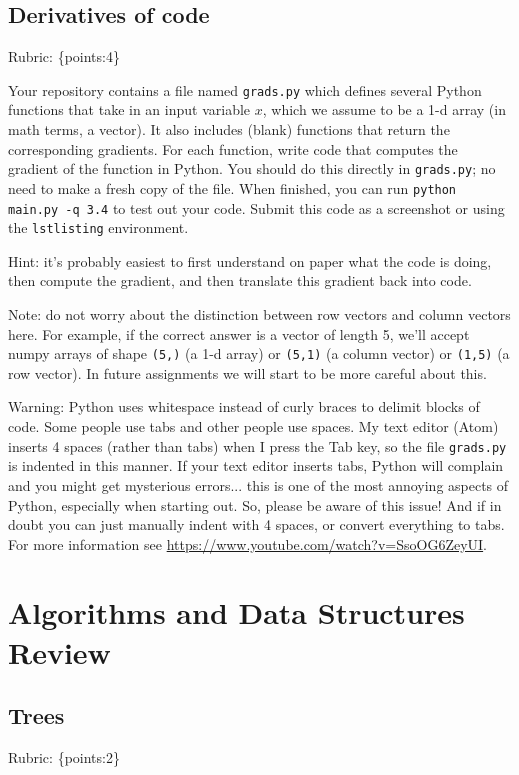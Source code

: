 \documentclass{article}
\def\rubric#1{\gre{Rubric: \{#1\}}}{}
\def\blu#1{{\color{blu}#1}}
\def\gre#1{{\color{gre}#1}}
\begin{document}
	\subsection{Derivatives of code}
	
	\rubric{points:4}
	
	Your repository contains a file named \texttt{grads.py} which defines several Python functions that take in an input variable $x$, which we assume to be a 1-d array (in math terms, a vector).
	It also includes (blank) functions that return the corresponding gradients.
	For each function, \blu{write code that computes the gradient of the function} in Python.
	You should do this directly in \texttt{grads.py}; no need to make a fresh copy of the file. When finished, you can run \texttt{python main.py -q 3.4} to test out your code. \blu{Submit this code as a screenshot or using the \texttt{lstlisting} environment.}
	
	Hint: it's probably easiest to first understand on paper what the code is doing, then compute
	the gradient, and then translate this gradient back into code.
	
	Note: do not worry about the distinction between row vectors and column vectors here.
	For example, if the correct answer is a vector of length 5, we'll accept numpy arrays
	of shape \texttt{(5,)} (a 1-d array) or \texttt{(5,1)} (a column vector) or
	\texttt{(1,5)} (a row vector). In future assignments we will start to be more careful
	about this.
	
	Warning: Python uses whitespace instead of curly braces to delimit blocks of code.
	Some people use tabs and other people use spaces. My text editor (Atom) inserts 4 spaces (rather than tabs) when
	I press the Tab key, so the file \texttt{grads.py} is indented in this manner. If your text editor inserts tabs,
	Python will complain and you might get mysterious errors... this is one of the most annoying aspects
	of Python, especially when starting out. So, please be aware of this issue! And if in doubt you can just manually
	indent with 4 spaces, or convert everything to tabs. For more information
	see \url{https://www.youtube.com/watch?v=SsoOG6ZeyUI}.
	
	
	\section{Algorithms and Data Structures Review}
	
	\subsection{Trees}
	\rubric{points:2}
	
\end{document}
